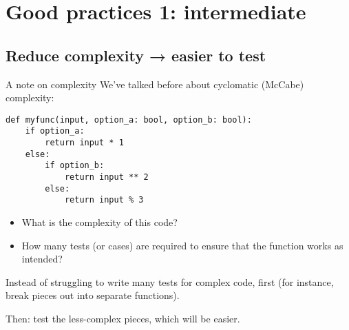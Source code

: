 \documentclass[12pt,aspectratio=169]{beamer}
\begin{document}
\section{Good practices 1: intermediate}
\subsection{Reduce complexity → easier to test}
\begin{frame}[fragile]{A note on complexity}
We've talked before about cyclomatic (McCabe) complexity:
\begin{verbatim}
def myfunc(input, option_a: bool, option_b: bool):
    if option_a:
        return input * 1
    else:
        if option_b:
            return input ** 2
        else:
            return input % 3
\end{verbatim}
\begin{itemize}
    \item What is the complexity of this code?
    \item How many tests (or cases) are required to ensure that the function works as intended?
\end{itemize}

\medskip
Instead of struggling to write many tests for complex code, first  (for instance, break pieces out into separate functions).

\hspace{14mm}Then: test the less-complex pieces, which will be easier.
\end{frame}
\end{document}
